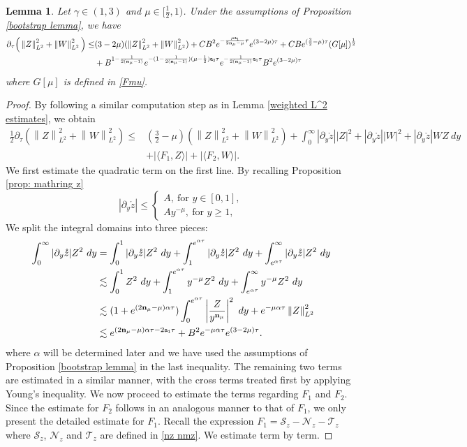 \documentclass{article}
\newcommand{\norm}[1]{\left\lVert#1\right\rVert}
\newcommand{\ga}{\gamma}
\newcommand{\al}{\alpha}
\newcommand{\pa}{\partial}
\def\beqa{\begin{equation}\begin{aligned}}
\def\eeqa{\end{aligned}\end{equation}}
\def\espz{Z}
\def\espw{W}
\def\nz{\mathcal N_z}
\def\nmz{\mathcal T_z}
\def\epone{\mathtt{a_1}}
\def\eptwo{\mathtt{a_2}}
\def\ndmu{{\bf{n}_{\mu}}}
\numberwithin{equation}{section}
\newtheorem{lemma}[theorem]{Lemma}
\begin{document}
\begin{lemma}\label{lemma L2}
    Let $\ga\in(1,3)$ and $\mu\in[\frac{1}{2},1)$.  Under the assumptions of Proposition \ref{bootstrap lemma}, we have
    \begin{align}
        \pa_\tau\Big(\norm{\espz}_{L^2}^2+\norm{\espw}_{L^2}^2\Big)\leq &(3-2\mu) (\norm{\espz}_{L^2}^2 +  \norm{\espw}_{L^2}^2) +CB^2 e^{-\frac{\mu\epone}{2\ndmu-\mu}\tau} e^{(3-2\mu)\tau}+CBe^{(\frac{3}{2}-\mu)\tau}(G[\mu])^{\frac12}\notag \\
            &+B^{1-\frac{1}{2(\ndmu-1)}} e^{-(1-\frac{1}{2(\ndmu-1)})(\mu-\frac12)\eptwo \tau}e^{-\frac{1}{2(\ndmu-1)}\epone\tau}B^2 e^{(3-2\mu)\tau} \label{l2 main}
    \end{align}
    where $G[\mu]$ is defined in \eqref{Fmu}.
\end{lemma}
\begin{proof}
     By following a similar computation step 
     as in Lemma \ref{weighted L^2 estimates}, we obtain
     \[
     \begin{split}
\frac12\pa_\tau(\norm{\espz}_{L^2}^2 +  \norm{\espw}_{L^2}^2) \leq & (\frac32-\mu) (\norm{\espz}_{L^2}^2 +  \norm{\espw}_{L^2}^2)+ \int_0^\infty    |\pa_y \mathring z| |\espz|^2+|\pa_y \mathring z | |\espw|^2 +| \pa_y\mathring z| \espw\espz\ dy \\
&+\left| \langle F_1,\espz \rangle\right|+\left| \langle F_2,\espw \rangle\right|.
    \end{split}
     \]
     We first estimate the quadratic term on the first line. By recalling Proposition \ref{prop: mathring z}
     $$ |\pa_y\mathring z|\leq \begin{cases}
		A,\ \text{for } y\in[0,1],\\
		Ay^{-\mu},\ \text{for } y \ge 1,
	\end{cases}$$
    We split the integral domains into three pieces:
    \beqa\label{L2 linear}
        \int_0^\infty |\pa_y\mathring z| \espz^2 \ dy &= \int_0^1 |\pa_y\mathring z| \espz^2 \ dy+ \int_1^{e^{\al\tau}}|\pa_y\mathring z |\espz^2 \ dy +\int_{e^{\al\tau}}^\infty |\pa_y\mathring z |\espz^2 \ dy \\
        &\lesssim \int_0^1  \espz^2 \ dy+ \int_1^{e^{\al\tau}} y^{-\mu}\espz^2 \ dy +\int_{e^{\al\tau}}^\infty  y^{-\mu} \espz^2 \ dy \\
        &\lesssim (1+e^{(2\ndmu-\mu)\al\tau})\int_0^{e^{\al\tau}}  \left|\frac{\espz}{y^\ndmu}\right|^2 \ dy + e^{-\mu\al\tau} \norm{\espz}_{L^2}^2 \\
        &\lesssim e^{(2\ndmu-\mu)\al\tau-2\epone \tau}+B^2 e^{-\mu\al\tau} e^{(3-2\mu)\tau}.
    \eeqa
    where $\al$ will be determined later and we have used the assumptions of Proposition \ref{bootstrap lemma} in the last inequality.
        The remaining two terms are estimated in a similar manner, with the cross terms treated first by applying Young’s inequality. We now proceed to estimate the terms regarding $F_1$ and $F_2$. Since the estimate for $F_2$ follows in an analogous manner to that of $F_1$, we only present the detailed estimate for $F_1$. Recall the expression 
           $ F_1 = \mathcal S_z -\nz - \nmz$ 
        where $\mathcal S_z$, $\nz$ and $\nmz$ are defined in \eqref{nz nmz}. We estimate term by term.


\end{proof}
\end{document}
